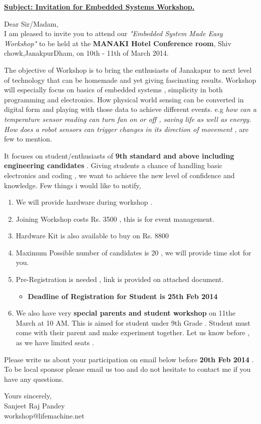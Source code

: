 \documentclass[12pt]{article} %
\begin{document}
\begin{titlepage}


\underline{ \textbf{Subject: Invitation for Embedded Systems Workshop.}}\vspace{10mm} 

Dear Sir/Madam,\\
I am pleased to invite you to attend our \textit{"Embedded System Made Easy Workshop"} to be held at the \textbf{MANAKI Hotel Conference room}, Shiv chowk,JanakpurDham, on 10th - 11th of March 2014.\vspace{1mm}

The objective of Workshop is to bring the enthusiasts of Janakapur to next level of technology that can be homemade and yet giving fascinating results. Workshop will especially focus on basics of embedded systems , simplicity in both programming and electronics. How physical world sensing can be converted in digital form and playing with those data to achieve different events. e.g \textit{how can a temperature sensor reading can turn fan on or off , saving life as well as energy. How does a robot sensors can trigger changes in its direction of movement ,} are few to mention.\vspace{1mm}

It focuses on student/enthusiasts of \textbf{9th standard and above including engineering candidates} . Giving students a chance of handling basic electronics and coding , we want to achieve the new level of confidence and knowledge.\vspace{1mm} 
Few things i would like to notify,
\begin{enumerate} \itemsep0em
\item We will provide hardware during workshop .
\item Joining Workshop costs  Rs. 3500 , this is for event management.
\item Hardware Kit is also available to buy on Rs. 8800 
\item Maximum Possible number of candidates is 20 , we will provide time slot for you.
\item Pre-Registration is needed , link is provided on attached document.
	\begin{itemize}	
	\item \textbf{Deadline of Registration for Student is 25th Feb 2014}
	\end{itemize}
\item We also have very \textbf{special parents and student workshop} on 11the March at 10 AM. This is aimed for student under 9th Grade . Student must come with their parent and make experiment together. Let us know before , as we have limited seats .
\end{enumerate}
Please write us about your participation on email below before \textbf{20th Feb 2014} . To be local sponsor please email us too and do not hesitate to contact me if you have any questions.\\

\begin{flushleft}
Yours sincerely,\\ 
Sanjeet Raj Pandey\\ 
workshop@lifemachine.net\\
\end{flushleft}

\end{titlepage}
\end{document}
